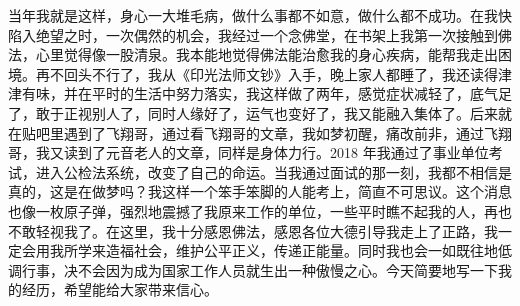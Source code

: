 \begin{case}
    当年我就是这样，身心一大堆毛病，做什么事都不如意，做什么都不成功。在我快陷入绝望之时，一次偶然的机会，我经过一个念佛堂，在书架上我第一次接触到佛法，心里觉得像一股清泉。我本能地觉得佛法能治愈我的身心疾病，能帮我走出困境。再不回头不行了，我从《印光法师文钞》入手，晚上家人都睡了，我还读得津津有味，并在平时的生活中努力落实，我这样做了两年，感觉症状减轻了，底气足了，敢于正视别人了，同时人缘好了，运气也变好了，我又能融入集体了。后来就在贴吧里遇到了飞翔哥，通过看飞翔哥的文章，我如梦初醒，痛改前非，通过飞翔哥，我又读到了元音老人的文章，同样是身体力行。2018 年我通过了事业单位考试，进入公检法系统，改变了自己的命运。当我通过面试的那一刻，我都不相信是真的，这是在做梦吗？我这样一个笨手笨脚的人能考上，简直不可思议。这个消息也像一枚原子弹，强烈地震撼了我原来工作的单位，一些平时瞧不起我的人，再也不敢轻视我了。在这里，我十分感恩佛法，感恩各位大德引导我走上了正路，我一定会用我所学来造福社会，维护公平正义，传递正能量。同时我也会一如既往地低调行事，决不会因为成为国家工作人员就生出一种傲慢之心。今天简要地写一下我的经历，希望能给大家带来信心。

\end{case}
